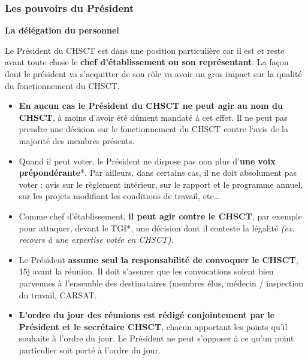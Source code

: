 \documentclass{beamer}
\begin{document}
\begin{frame}
\frametitle{Les pouvoirs du Président}

\textbf{La délégation du personnel}

Le Président du CHSCT est dans une position particulière car il est et reste avant toute chose le \textbf{chef d’établissement ou son représentant}. La façon dont le président va s’acquitter de son rôle va avoir un gros impact sur la qualité du fonctionnement du CHSCT.
\begin{itemize}
\item \textbf{En aucun cas le Président du CHSCT ne peut agir au nom du CHSCT}, à moins d’avoir été dûment mandaté à cet effet. Il ne peut pas prendre une décision sur le fonctionnement du CHSCT contre l‘avis de la majorité des membres présents. 

\item Quand il peut voter, le Président ne dispose pas non plus d’\textbf{une voix prépondérante}*. Par ailleurs, dans certains cas, il ne doit absolument pas voter : avis sur le règlement intérieur, sur le rapport et le programme annuel, sur les projets modifiant les conditions de travail, etc… 

\item Comme chef d’établissement, \textbf{il peut agir contre le CHSCT}, par exemple pour attaquer, devant le TGI*, une décision dont il conteste la légalité \textit{(ex. recours à une expertise votée en CHSCT)}.

\item Le Président \textbf{assume seul la responsabilité de convoquer le CHSCT}, 15j avant la réunion. Il doit s’assurer que les convocations soient bien parvenues à l’ensemble des destinataires (membres élus, médecin / inspection du travail, CARSAT.

\item \textbf{L’ordre du jour des réunions est rédigé conjointement par le Président et le secrétaire CHSCT}, chacun apportant les points qu’il souhaite à l’ordre du jour. Le Président ne peut s’opposer à ce qu’un point particulier soit porté à l’ordre du jour.
\end{itemize}
\end{frame}
\end{document}
